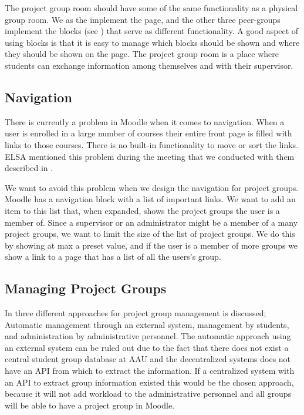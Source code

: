 The project group room should have some of the same functionality as a physical group room.
We as the \groupname{} implement the page, and the other three peer-groups implement the blocks (see ) that serve as different functionality.
A good aspect of using blocks is that it is easy to manage which blocks should be shown and where they should be shown on the page.
The project group room is a place where students can exchange information among themselves and with their supervisor.

\subsection{Navigation}
\label{sub:designprojectgroupnavigation}
There is currently a problem in Moodle when it comes to navigation. 
When a user is enrolled in a large number of courses their entire front page is filled with links to those courses.
There is no built-in functionality to move or sort the links.
ELSA mentioned this problem during the meeting that we conducted with them described in .

We want to avoid this problem when we design the navigation for project groups.
Moodle has a navigation block with a list of important links.
We want to add an item to this list that, when expanded, shows the project groups the user is a member of.
Since a supervisor or an administrator might be a member of a many project groups, we want to limit the size of the list of project groups.
We do this by showing at max a preset value, and if the user is a member of more groups we show a link to a page that has a list of all the users's group.

\subsection{Managing Project Groups}
In  three different approaches for project group management is discussed; Automatic management through an external system, management by students, and administration by administrative personnel. 
The automatic approach using an external system can be ruled out due to the fact that there does not exist a central student group database at AAU and the decentralized systems does not have an API from which to extract the information. 
If a centralized system with an API to extract group information existed this would be the chosen approach, because it will not add workload to the administrative personnel and all groups will be able to have a project group in Moodle. 


